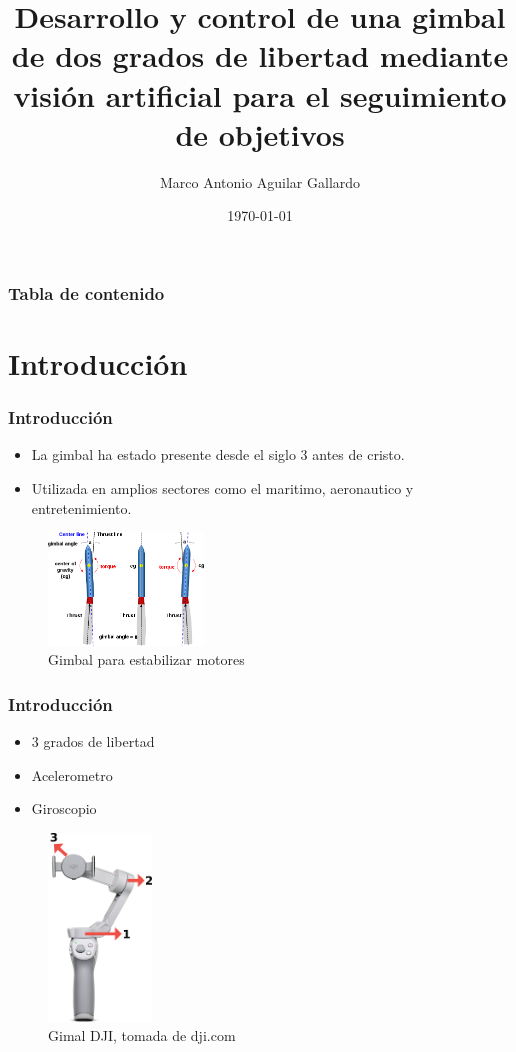 \documentclass[11pt]{beamer}
\title{Desarrollo y control de una gimbal de dos grados de libertad mediante visión artificial para el seguimiento
de objetivos}
\author{Marco Antonio Aguilar Gallardo}
\institute{Universidad Aeronáutica en Querétaro}
\date{\today}
\begin{document}
  \frame{\titlepage}

  \begin{frame}
    \frametitle{Tabla de contenido}
    \tableofcontents
  \end{frame}

  \section{Introducción}
  \begin{frame}[t]
    \frametitle{Introducción}
    \begin{itemize}
    \item La gimbal ha estado presente desde el siglo 3 antes de cristo.
    \item Utilizada en amplios sectores como el maritimo, aeronautico y entretenimiento.
    \end{itemize}
    \begin{figure}[h]
      \includegraphics[height=3cm, keepaspectratio]{images/rocket.png}
      \caption{Gimbal para estabilizar motores}
      \label{fig:rocket}
    \end{figure}
  \end{frame}
  \begin{frame}
    \frametitle{Introducción}
    \begin{multicols*}{2}
      \begin{itemize}
        \item 3 grados de libertad
        \item Acelerometro
        \item Giroscopio
      \end{itemize}
      \begin{figure}[h]
        \includegraphics[height=5cm, keepaspectratio]{images/dji.png}
        \caption{Gimal DJI, tomada de dji.com}
        \label{dji}
      \end{figure}
    \end{multicols*}
  \end{frame}
\end{document}
